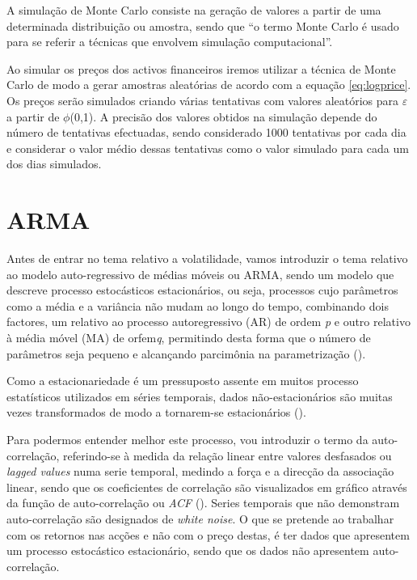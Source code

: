 \documentclass[
  12pt,
  a4paper,
  openany]{book}
\begin{document}
A simulação de Monte Carlo consiste na geração de valores a partir de uma determinada distribuição ou amostra, sendo que ``o termo Monte Carlo é usado para se referir a técnicas que envolvem simulação computacional''\citep[pp.457]{ProgSim}.

Ao simular os preços dos activos financeiros iremos utilizar a técnica de Monte Carlo de modo a gerar amostras aleatórias de acordo com a equação \eqref{eq:logprice}. Os preços serão simulados criando várias tentativas com valores aleatórios para \(\varepsilon\) a partir de \(\phi\)(0,1). A precisão dos valores obtidos na simulação depende do número de tentativas efectuadas, sendo considerado 1000 tentativas por cada dia e considerar o valor médio dessas tentativas como o valor simulado para cada um dos dias simulados.

\hypertarget{arma}{%
\section{ARMA}\label{arma}}

Antes de entrar no tema relativo a volatilidade, vamos introduzir o tema relativo ao modelo auto-regressivo de médias móveis ou ARMA, sendo um modelo que descreve processo estocásticos estacionários, ou seja, processos cujo parâmetros como a média e a variância não mudam ao longo do tempo, combinando dois factores, um relativo ao processo autoregressivo (AR) de ordem \emph{p} e outro relativo à média móvel (MA) de orfem\emph{q}, permitindo desta forma que o número de parâmetros seja pequeno e alcançando parcimônia na parametrização (\citet{parcimonia}).

Como a estacionariedade é um pressuposto assente em muitos processo estatísticos utilizados em séries temporais, dados não-estacionários são muitas vezes transformados de modo a tornarem-se estacionários (\citet{stwiki}).

Para podermos entender melhor este processo, vou introduzir o termo da auto-correlação, referindo-se à medida da relação linear entre valores desfasados ou \emph{lagged values} numa serie temporal, medindo a força e a direcção da associação linear, sendo que os coeficientes de correlação são visualizados em gráfico através da função de auto-correlação ou \emph{ACF} (\citet{foregeorge}). Series temporais que não demonstram auto-correlação são designados de \emph{white noise}. O que se pretende ao trabalhar com os retornos nas acções e não com o preço destas, é ter dados que apresentem um processo estocástico estacionário, sendo que os dados não apresentem auto-correlação.
\end{document}
